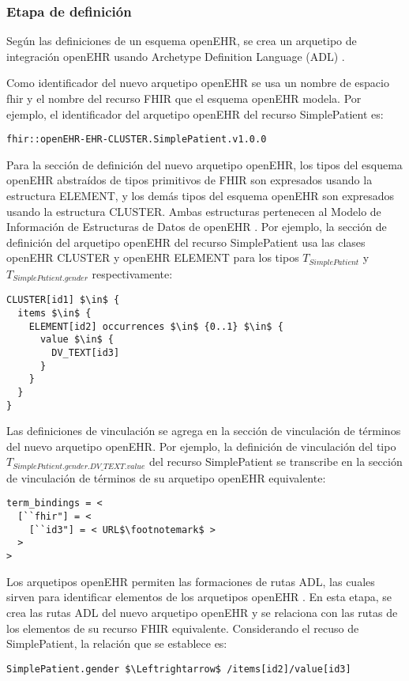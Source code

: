 \subsubsection{Etapa de definición}

Según las definiciones de un esquema openEHR, se crea un arquetipo de integración openEHR usando Archetype Definition Language (ADL) \cite{openEHRADL}.

Como identificador del nuevo arquetipo openEHR se usa un nombre de espacio fhir y el nombre del recurso FHIR que el esquema openEHR modela. Por ejemplo, el identificador del arquetipo openEHR del recurso SimplePatient es:

\begin{lstlisting}
fhir::openEHR-EHR-CLUSTER.SimplePatient.v1.0.0
\end{lstlisting}

Para la sección de definición del nuevo arquetipo openEHR, los tipos del esquema openEHR abstraídos de tipos primitivos de FHIR son expresados usando la estructura ELEMENT, y los demás tipos del esquema openEHR son expresados usando la estructura CLUSTER. Ambas estructuras pertenecen al Modelo de Información de Estructuras de Datos de openEHR \cite{openEHRDataStructures}. Por ejemplo, la sección de definición del arquetipo openEHR del recurso SimplePatient usa las clases openEHR CLUSTER y openEHR ELEMENT para los tipos \(T_{SimplePatient}\) y \(T_{SimplePatient.gender}\) respectivamente:

\begin{lstlisting}[mathescape=true]
CLUSTER[id1] $\in$ {
  items $\in$ {
    ELEMENT[id2] occurrences $\in$ {0..1} $\in$ {
      value $\in$ {
        DV_TEXT[id3]
      }
    }
  }
}
\end{lstlisting}

Las definiciones de vinculación se agrega en la sección de vinculación de términos del nuevo arquetipo openEHR. Por ejemplo, la definición de vinculación del tipo \(T_{SimplePatient.gender.DV\_TEXT.value}\) del recurso SimplePatient se transcribe en la sección de vinculación de términos de su arquetipo openEHR equivalente:

\begin{lstlisting}[escapechar=$]
term_bindings = <
  [``fhir"] = <
    [``id3"] = < URL$\footnotemark$ >
  >
>
\end{lstlisting}


Los arquetipos openEHR permiten las formaciones de rutas ADL, las cuales sirven para identificar elementos de los arquetipos openEHR \cite{openEHRArchitecture}. En esta etapa, se crea las rutas ADL del nuevo arquetipo openEHR y se relaciona con las rutas de los elementos de su recurso FHIR equivalente. Considerando el recuso de SimplePatient, la relación que se establece es:

\begin{lstlisting}[mathescape=true]
SimplePatient.gender $\Leftrightarrow$ /items[id2]/value[id3]
\end{lstlisting}
